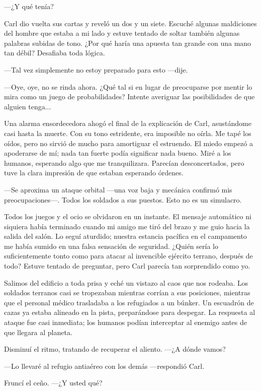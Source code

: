  —¿Y qué tenía?

Carl dio vuelta sus cartas y reveló un dos y un siete. Escuché algunas maldiciones del hombre que estaba a mi lado y estuve tentado de soltar también algunas palabras subidas de tono. ¿Por qué haría una apuesta tan grande con una mano tan débil? Desafiaba toda lógica.

—Tal vez simplemente no estoy preparado para esto —dije.

—Oye, oye, no se rinda ahora. ¿Qué tal si en lugar de preocuparse por mentir lo mira como un juego de probabilidades? Intente averiguar las posibilidades de que alguien tenga...

Una alarma ensordecedora ahogó el final de la explicación de Carl, asustándome casi hasta la muerte. Con su tono estridente, era imposible no oírla. Me tapé los oídos, pero no sirvió de mucho para amortiguar el estruendo. El miedo empezó a apoderarse de mí; nada tan fuerte podía significar nada bueno. Miré a los humanos, esperando algo que me tranquilizara. Parecían desconcertados, pero tuve la clara impresión de que estaban esperando órdenes.

—Se aproxima un ataque orbital —una voz baja y mecánica confirmó mis preocupaciones—. Todos los soldados a sus puestos. Esto no es un simulacro.

Todos los juegos y el ocio se olvidaron en un instante. El mensaje automático ni siquiera había terminado cuando mi amigo me tiró del brazo y me guio hacia la salida del salón. Lo seguí aturdido; nuestra estancia pacífica en el campamento me había sumido en una falsa sensación de seguridad. ¿Quién sería lo suficientemente tonto como para atacar al invencible ejército terrano, después de todo? Estuve tentado de preguntar, pero Carl parecía tan sorprendido como yo.

Salimos del edificio a toda prisa y eché un vistazo al caos que nos rodeaba. Los soldados terranos casi se tropezaban mientras corrían a sus posiciones, mientras que el personal médico trasladaba a los refugiados a un búnker. Un escuadrón de cazas ya estaba alineado en la pista, preparándose para despegar. La respuesta al ataque fue casi inmediata; los humanos podían interceptar al enemigo antes de que llegara al planeta.

Disminuí el ritmo, tratando de recuperar el aliento. —¿A dónde vamos?

—Lo llevaré al refugio antiaéreo con los demás —respondió Carl.

Fruncí el ceño. —¿Y usted qué?

